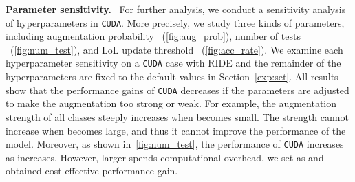 \documentclass{article}
\newcommand{\myparagraph}[1]{\vspace{0.07cm}\noindent\textbf{#1}~}
\def\code#1{\texttt{#1}}
\newcommand{\alg}{\code{CUDA}\xspace}
\begin{document}
\myparagraph{Parameter sensitivity.} For further analysis, we conduct a sensitivity analysis of hyperparameters in \alg. More precisely, we study three kinds of parameters, including augmentation probability ~(\autoref{fig:aug_prob}), number of tests ~(\autoref{fig:num_test}), and LoL update threshold ~(\autoref{fig:acc_rate}). We examine each hyperparameter sensitivity on a \alg case with RIDE and the remainder of the hyperparameters are fixed to the default values in Section~\ref{exp:set}. All results show that the performance gains of \alg decreases if the parameters are adjusted to make the augmentation too strong or weak. For example, the augmentation strength of all classes steeply increases when  becomes small. The strength cannot increase when  becomes large, and thus it cannot improve the performance of the model. Moreover, as shown in~\autoref{fig:num_test}, the performance of \alg increases as  increases. However, larger  spends computational overhead, we set  as  and obtained cost-effective performance gain.
\end{document}
